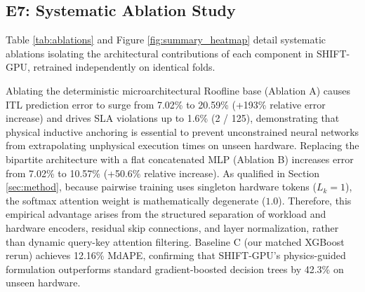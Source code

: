 \documentclass[preprint,12pt]{elsarticle}
\begin{document}
\subsection{E7: Systematic Ablation Study}
Table \ref{tab:ablations} and Figure \ref{fig:summary_heatmap} detail systematic ablations isolating the architectural contributions of each component in SHIFT-GPU, retrained independently on identical folds.

\begin{table}[h]
\centering
\caption{Systematic ablation study isolating architectural and algorithmic components of SHIFT-GPU. All variants retrained independently across identical folds.}
\label{tab:ablations}
\end{table}

Ablating the deterministic microarchitectural Roofline base (Ablation A) causes ITL prediction error to surge from 7.02\% to 20.59\% (+193\% relative error increase) and drives SLA violations up to 1.6\% (2 / 125), demonstrating that physical inductive anchoring is essential to prevent unconstrained neural networks from extrapolating unphysical execution times on unseen hardware. Replacing the bipartite architecture with a flat concatenated MLP (Ablation B) increases error from 7.02\% to 10.57\% (+50.6\% relative increase). As qualified in Section \ref{sec:method}, because pairwise training uses singleton hardware tokens ($L_k = 1$), the softmax attention weight is mathematically degenerate ($1.0$). Therefore, this empirical advantage arises from the structured separation of workload and hardware encoders, residual skip connections, and layer normalization, rather than dynamic query-key attention filtering. Baseline C (our matched XGBoost rerun) achieves 12.16\% MdAPE, confirming that SHIFT-GPU's physics-guided formulation outperforms standard gradient-boosted decision trees by 42.3\% on unseen hardware.
\end{document}
